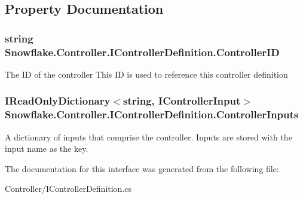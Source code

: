 \subsection{Property Documentation}
\hypertarget{interface_snowflake_1_1_controller_1_1_i_controller_definition_a91b1721244d428e39c1833bd82a7c420}{}
\subsubsection[{Controller\+I\+D}]{\setlength{\rightskip}{0pt plus 5cm}string Snowflake.\+Controller.\+I\+Controller\+Definition.\+Controller\+I\+D\hspace{0.3cm}{\ttfamily [get]}}\label{interface_snowflake_1_1_controller_1_1_i_controller_definition_a91b1721244d428e39c1833bd82a7c420}


The I\+D of the controller This I\+D is used to reference this controller definition 

\hypertarget{interface_snowflake_1_1_controller_1_1_i_controller_definition_a3d0737e0a8d939836e8c453c8f6625aa}{}
\subsubsection[{Controller\+Inputs}]{\setlength{\rightskip}{0pt plus 5cm}I\+Read\+Only\+Dictionary$<$string, {\bf I\+Controller\+Input}$>$ Snowflake.\+Controller.\+I\+Controller\+Definition.\+Controller\+Inputs\hspace{0.3cm}{\ttfamily [get]}}\label{interface_snowflake_1_1_controller_1_1_i_controller_definition_a3d0737e0a8d939836e8c453c8f6625aa}


A dictionary of inputs that comprise the controller. Inputs are stored with the input name as the key. 



The documentation for this interface was generated from the following file\+:\begin{DoxyCompactItemize}
\item 
Controller/I\+Controller\+Definition.\+cs\end{DoxyCompactItemize}
